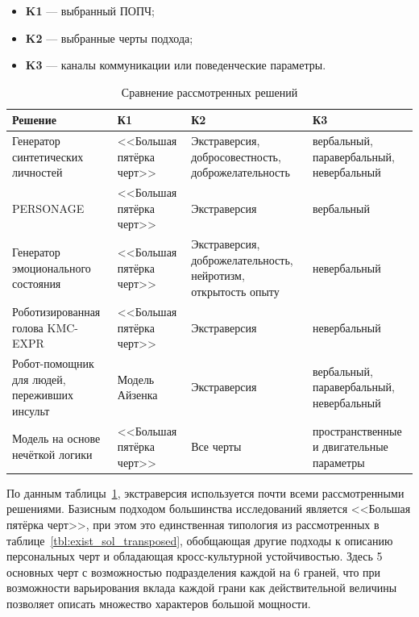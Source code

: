 \begin{itemize}
	\item \textbf{K1} --- выбранный ПОПЧ;
	\item \textbf{K2} --- выбранные черты подхода;
	\item \textbf{K3} --- каналы коммуникации или поведенческие параметры.
\end{itemize}

\begin{table}[h]
	\centering
	\begin{threeparttable}
		\caption{Сравнение рассмотренных решений}
		\label{tbl:exist_sol_transposed2}
		\begin{tabularx}{\textwidth}{|X|X|X|X|}
			\hline
			\textbf{Решение} & \textbf{К1} & \textbf{К2} & \textbf{К3} \\
			\hline
			Генератор синтетических личностей~\cite{Recchiuto2023SoftwareFramework} &
			<<Большая пятёрка черт>> &
			Экстраверсия, добросовестность, доброжелательность &
			вербальный, паравербальный, невербальный \\
			\hline
			PERSONAGE~\cite{Mairesse2007Personage} &
			<<Большая пятёрка черт>> &
			Экстраверсия &
			вербальный \\
			\hline
			Генератор эмоционального состояния~\cite{Chae2025AffectiveState} &
			<<Большая пятёрка черт>> &
			Экстраверсия, доброжелательность, нейротизм, открытость опыту &
			невербальный \\
			\hline
			Роботизированная голова KMC-EXPR~\cite{park2012lawofattraction} &
			<<Большая пятёрка черт>> &
			Экстраверсия &
			невербальный \\
			\hline
			Робот-помощник для людей, переживших инсульт~\cite{tapus2008personalitymatching} &
			Модель Айзенка &
			Экстраверсия &
			вербальный, паравербальный, невербальный \\
			\hline
			Модель на основе нечёткой логики~\cite{xue2017fuzzy} &
			<<Большая пятёрка черт>> &
			Все черты &
			пространственные и двигательные параметры \\
			\hline
		\end{tabularx}
	\end{threeparttable}
\end{table}

По данным таблицы~\ref{tbl:exist_sol_transposed2}, экстраверсия используется почти всеми рассмотренными решениями.
Базисным подходом большинства исследований является <<Большая пятёрка черт>>, при этом это единственная типология из рассмотренных в таблице~\ref{tbl:exist_sol_transposed}, обобщающая другие подходы к описанию персональных черт и обладающая кросс-культурной устойчивостью.
Здесь 5 основных черт с возможностью подразделения каждой на 6 граней, что при возможности варьирования вклада каждой грани как действительной величины позволяет описать множество характеров большой мощности.

